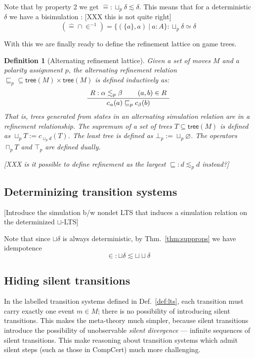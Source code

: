 \documentclass[11pt]{article}
\newcommand{\kw}[1]{{\mathsf{#1}}}
\newtheorem{definition}{Definition}
\begin{document}
Note that by property 2 we get ${\hat{=}} : \sqcup_p \delta \lesssim \delta$.
This means that for a deterministic $\delta$ we have a bisimulation :
[XXX this is not quite right]
\[ ({\hat{=}} \cap {\in^{-1}}) = \{(\{a\}, a) \:|\: a : A \} : \sqcup_p \delta
\simeq \delta \]

With this we are finally ready to define the refinement lattice on game trees.

\begin{definition}[Alternating refinement lattice]
Given a set of moves $M$ and a polarity assignment $p$,
the alternating refinement relation ${\sqsubseteq_p} \subseteq \kw{tree}(M)
\times \kw{tree}(M)$ is defined inductively as:
\[
  \AxiomC{$R : \alpha \lesssim_p \beta$}
  \AxiomC{$(a, b) \in R$}
  \BinaryInfC{$c_\alpha(a) \sqsubseteq_p c_\beta(b)$}
  \DisplayProof
\]
That is, trees generated from states in an alternating simulation relation
are in a refinement relationship.
The supremum of a set of trees $T \subseteq \kw{tree}(M)$
is defined as $\sqcup_p T := c_{\sqcup_p d}(T)$.
The least tree is defined as $\bot_p := \sqcup_p \varnothing$.
The operators $\sqcap_p T$ and $\top_p$ are defined dually.

[XXX is it possible to define refinement as the largest
${\sqsubseteq} : d \lesssim_p d$ instead?]
\end{definition}

\subsection{Determinizing transition systems}

[Introduce the simulation b/w nondet LTS that induces
a simulation relation on the determinized $\sqcup$-LTS]

Note that since $\sqcup \delta$ is always deterministic,
by Thm.~\ref{thm:supprops} we have idempotence
\[ {\in} : {\sqcup \delta} \lesssim {\sqcup}{\sqcup}\delta \]


\subsection{Hiding silent transitions}

In the labelled transition systems defined in Def.~\ref{def:lts},
each transition must carry exactly one event $m \in M$;
there is no possibility of introducing silent transitions.
This makes the meta-theory much simpler,
because silent transitions introduce the possibility of
unobservable \emph{silent divergence} ---
infinite sequences of silent transitions.
This make reasoning about transition systems
which admit silent steps (such as those in CompCert)
much more challenging.
\end{document}
